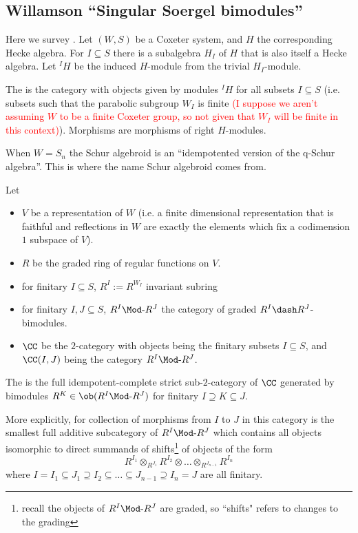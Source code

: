 
\subsection{Willamson ``Singular Soergel bimodules''}\label{williamson_sec}
Here we survey \cite{williamson2011singular}. Let $(W,S)$ be a Coxeter system, and $H$ the corresponding Hecke algebra. For $I\subseteq S$ there is a subalgebra $H_I$ of $H$ that is also itself a Hecke algebra. Let $^I H$ be the induced $H$-module from the trivial $H_I$-module.
\begin{definition} The  is the category with objects given by modules $^I H$ for all  subsets $I\subseteq S$ (i.e. subsets such that the parabolic subgroup $W_I$ is finite \textcolor{red}{(I suppose we aren't assuming $W$ to be a finite Coxeter group, so not given that $W_I$ will be finite in this context)}). Morphisms are morphisms of right $H$-modules.\bb

\nt When $W=S_n$ the Schur algebroid is an ``idempotented version of the q-Schur algebra''. This is where the name Schur algebroid comes from.
\end{definition}

\nt Let \begin{itemize}
  \item $V$ be a  representation of $W$ (i.e. a finite dimensional representation that is faithful and reflections in $W$ are exactly the elements which fix a codimension $1$ subspace of $V$).
  \item $R$ be the graded ring of regular functions on $V$.
  \item for finitary $I\subseteq S$, $R^I:=R^{W_I}$ invariant subring
  \item for finitary $I,J\subseteq S$, $R^I\Mod \text{-} R^J$ the category of graded $R^I\dash R^J$-bimodules.
  \item $\CC$ be the $2$-category with objects  being the finitary subsets $I\subseteq S$, and $\CC(I,J)$ being the category $R^I\Mod \text{-}R^J$.
\end{itemize}

\begin{definition} The  is the full idempotent-complete strict sub-$2$-category of $\CC$ generated by bimodules $R^K\in \ob(R^I\Mod \text{-} R^J)$ for finitary $I\supseteq K\subseteq J$.\bb

\nt More explicitly, for collection of morphisms from $I$ to $J$ in this category is the smallest full additive subcategory of $R^I\Mod \text{-} R^J$ which contains all objects isomorphic to direct summands of shifts\footnote{recall the objects of $R^I\Mod \text{-} R^J$ are graded, so ``shifts" refers to changes to the grading} of objects of the form
$$R^{I_1}\otimes_{R^{J_1}}R^{I_2}\otimes \dots \otimes_{R^{J_{n-1}}}R^{I_n}$$
where $I=I_1\subseteq J_1\supseteq I_2 \subseteq \dots \subseteq J_{n-1} \supseteq I_n=J$ are all finitary.
\end{definition}

